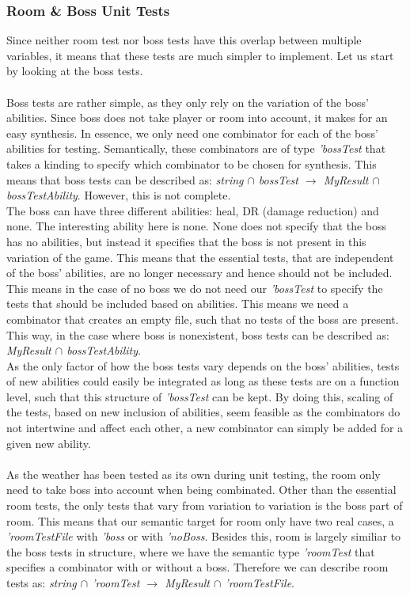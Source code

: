 \subsubsection{Room \& Boss Unit Tests}
Since neither room test nor boss tests have this overlap between multiple variables, it means that these tests are much simpler to implement. Let us start by looking at the boss tests. \\
\\
Boss tests are rather simple, as they only rely on the variation of the boss' abilities. Since boss does not take player or room into account, it makes for an easy synthesis. In essence, we only need one combinator for each of the boss' abilities for testing. Semantically, these combinators are of type \textit{'bossTest} that takes a kinding to specify which combinator to be chosen for synthesis. This means that boss tests can be described as: \textit{string $\cap$ bossTest $\to$ MyResult $\cap$ bossTestAbility}. However, this is not complete. \\
The boss can have three different abilities: heal, DR (damage reduction) and none. The interesting ability here is none. None does not specify that the boss has no abilities, but instead it specifies that the boss is not present in this variation of the game. This means that the essential tests, that are independent of the boss' abilities, are no longer necessary and hence should not be included. This means in the case of no boss we do not need our \textit{'bossTest} to specify the tests that should be included based on abilities. This means we need a combinator that creates an empty file, such that no tests of the boss are present. This way, in the case where boss is nonexistent, boss tests can be described as: \textit{MyResult $\cap$ bossTestAbility}. \\
As the only factor of how the boss tests vary depends on the boss' abilities, tests of new abilities could easily be integrated as long as these tests are on a function level, such that this structure of \textit{'bossTest} can be kept. By doing this, scaling of the tests, based on new inclusion of abilities, seem feasible as the combinators do not intertwine and affect each other, a new combinator can simply be added for a given new ability.  %
\\ \\
As the weather has been tested as its own during unit testing, the room only need to take boss into account when being combinated. Other than the essential room tests, the only tests that vary from variation to variation is the boss part of room. This means that our semantic target for room only have two real cases, a \textit{'roomTestFile} with \textit{'boss} or with \textit{'noBoss}. Besides this, room is largely similiar to the boss tests in structure, where we have the semantic type \textit{'roomTest} that specifies a combinator with or without a boss. Therefore we can describe room tests as: \textit{string $\cap$ 'roomTest $\to$ MyResult $\cap$ 'roomTestFile}. 